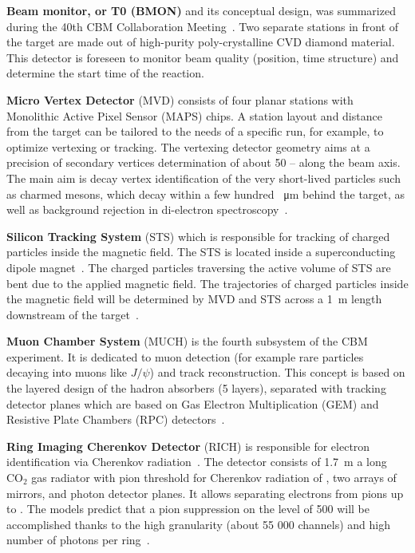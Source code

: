 \textbf{Beam monitor, or T0 (\gls{BMON})} and its conceptual design, was summarized during the 40th \gls{CBM} Collaboration Meeting~\cite{bmon}. Two separate stations in front of the target are made out of high-purity poly-crystalline CVD diamond material. This detector is foreseen to monitor beam quality (position, time structure) and determine the start time of the reaction.\bigbreak

\textbf{Micro Vertex Detector} (\gls{MVD}) consists of four planar stations with Monolithic Active Pixel Sensor (\gls{MAPS}) chips. A station layout and distance from the target can be tailored to the needs of a specific run, for example, to optimize vertexing or tracking. The vertexing detector geometry aims at a precision of secondary vertices determination of about 50 --  along the beam axis. The main aim is decay vertex identification of the very short-lived particles such as charmed mesons, which decay within a few hundred \SI{}{\micro\metre} behind the target, as well as background rejection in di-electron spectroscopy~\cite{MVD}.\bigbreak

 \textbf{Silicon Tracking System} (\gls{STS}) which is responsible for tracking of charged particles inside the magnetic field. The \gls{STS} is located inside a superconducting dipole magnet~\cite{Malakhov:109025}. The charged particles traversing the active volume of \gls{STS} are bent due to the applied magnetic field. The trajectories of charged particles inside the magnetic field will be determined by MVD and STS across a \SI{1}{\metre} length downstream of the target~\cite{Heuser:54798}.\bigbreak
 
\textbf{Muon Chamber System} (\gls{MUCH}) is the fourth subsystem of the \gls{CBM} experiment. It is dedicated to muon detection (for example rare particles decaying into muons like $J/\psi$) and track reconstruction. This concept is based on the layered design of the hadron absorbers (5 layers), separated with tracking detector planes which are based on Gas Electron Multiplication (\gls{GEM}) and Resistive Plate Chambers (\gls{RPC}) detectors~\cite{MUCH}.\bigbreak

\textbf{Ring Imaging Cherenkov Detector} (\gls{RICH}) is responsible for electron identification via Cherenkov radiation~\cite{RICH}. The detector consists of \SI{1.7}{\metre} a long $\mathrm{CO_{2}}$ gas radiator with pion threshold for Cherenkov radiation of , two arrays of mirrors, and photon detector planes. It allows separating electrons from pions up to . The models predict that a pion suppression on the level of 500 will be accomplished thanks to the high granularity (about 55 000 channels) and high number of photons per ring~\cite{RICH}.\bigbreak

